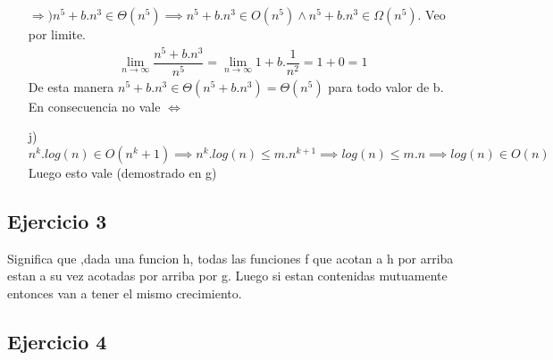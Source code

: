 \documentclass{article}
\begin{document}
\begin{itemize}
    $\Rightarrow) n^5+b.n^3 \in \Theta(n^5) \implies n^5+b.n^3 \in O(n^5) \land n^5+b.n^3 \in \Omega (n^5)$. Veo por limite.
    \setcounter{equation}{0}
    \begin{align}
        \lim_{n\to\infty}\dfrac{n^5+b.n^3}{n^5}=\lim_{n\to\infty}1+b.\dfrac{1}{n^2}=1+0=1
    \end{align} 
    De esta manera $n^5+b.n^3\in \Theta(n^5+b.n^3)=\Theta(n^5)$ para todo valor de b.
    En consecuencia no vale $\Leftrightarrow$

    \item [j) ] $n^k.log(n)\in O(n^k+1) \implies n^k.log(n)\leq m. n^{k+1} \implies log(n)\leq m.n \implies log(n)\in O(n)$\\
    Luego esto vale (demostrado en g)
\end{itemize}

\subsection*{Ejercicio 3}

Significa que ,dada una funcion h, todas las funciones f que acotan a h por arriba estan
a su vez acotadas por arriba por g. Luego si estan contenidas mutuamente entonces van a tener
el mismo crecimiento.

\subsection*{Ejercicio 4}
\end{document}
